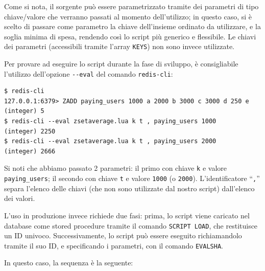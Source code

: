 \medskip
{}

Come si nota, il sorgente può essere parametrizzato tramite dei parametri di tipo chiave/valore
che verranno passati al momento dell'utilizzo; in questo caso, si è scelto di passare come parametro 
la chiave dell'insieme ordinato da utilizzare, e la soglia minima di spesa, rendendo così lo script 
più generico e flessibile. Le chiavi dei parametri (accessibili tramite l'array \verb|KEYS|) non
sono invece utilizzate.

Per provare ad eseguire lo script durante la fase di sviluppo, è consigliabile l'utilizzo
dell'opzione \verb|--eval| del comando \verb|redis-cli|:

\medskip
\begin{lstlisting}
$ redis-cli
127.0.0.1:6379> ZADD paying_users 1000 a 2000 b 3000 c 3000 d 250 e
(integer) 5
$ redis-cli --eval zsetaverage.lua k t , paying_users 1000
(integer) 2250
$ redis-cli --eval zsetaverage.lua k t , paying_users 2000
(integer) 2666
\end{lstlisting}

Si noti che abbiamo passato 2 parametri: il primo con chiave \verb|k| e valore \verb|paying_users|;
il secondo con chiave \verb|t| e valore \verb|1000| (o \verb|2000|). L'identificatore ``\verb|,|''
separa l'elenco delle chiavi (che non sono utilizzate dal nostro script) dall'elenco dei valori.

L'uso in produzione invece richiede due fasi: prima, lo script viene caricato nel database
come stored procedure tramite il comando \verb|SCRIPT LOAD|, che restituisce un ID univoco. 
Successivamente, lo script può essere eseguito richiamandolo tramite il suo ID, e specificando 
i parametri, con il comando \verb|EVALSHA|.

In questo caso, la sequenza è la seguente:

